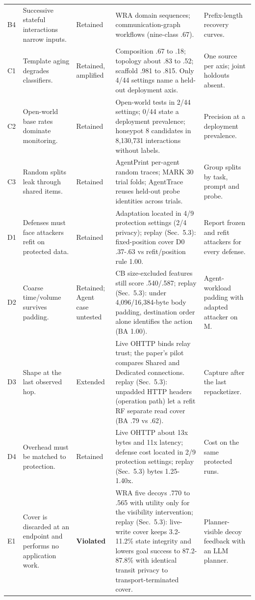 \begin{table}[t]
\begin{tabularx}{\textwidth}{@{}l>{\raggedright\arraybackslash}X>{\raggedright\arraybackslash}p{2.1cm}>{\raggedright\arraybackslash}X>{\raggedright\arraybackslash}X@{}}
B4 & Successive stateful interactions narrow inputs. & Retained & WRA domain sequences; communication-graph workflows (nine-class .67). & Prefix-length recovery curves.\\
C1 & Template aging degrades classifiers. & Retained, amplified & Composition .67 to .18; topology about .83 to .52; scaffold .981 to .815. Only 4/44 settings name a held-out deployment axis. & One source per axis; joint holdouts absent.\\
C2 & Open-world base rates dominate monitoring. & Retained & Open-world tests in 2/44 settings; 0/44 state a deployment prevalence; honeypot 8 candidates in 8,130,731 interactions without labels. & Precision at a deployment prevalence.\\
C3 & Random splits leak through shared items. & Retained & AgentPrint per-agent random traces; MARK 30 trial folds; AgentTrace reuses held-out probe identities across trials. & Group splits by task, prompt and probe.\\
D1 & Defenses must face attackers refit on protected data. & Retained & Adaptation located in 4/9 protection settings (2/4 privacy); replay (Sec.~5.3): fixed-position cover D0 .37-.63 vs refit/position rule 1.00. & Report frozen and refit attackers for every defense.\\
D2 & Coarse time/volume survives padding. & Retained; Agent case untested & CB size-excluded features still score .540/.587; replay (Sec.~5.3): under 4,096/16,384-byte body padding, destination order alone identifies the action (BA 1.00). & Agent-workload padding with adapted attacker on M.\\
D3 & Shape at the last observed hop. & Extended & Live OHTTP binds relay trust; the paper's pilot compares Shared and Dedicated connections. replay (Sec.~5.3): unpadded HTTP headers (operation path) let a refit RF separate read cover (BA .79 vs .62). & Capture after the last repacketizer.\\
D4 & Overhead must be matched to protection. & Retained & Live OHTTP about 13x bytes and 11x latency; defense cost located in 2/9 protection settings; replay (Sec.~5.3) bytes 1.25-1.40x. & Cost on the same protected runs.\\
E1 & Cover is discarded at an endpoint and performs no application work. & \textbf{Violated} & WRA five decoys .770 to .565 with utility only for the visibility intervention; replay (Sec.~5.3): live-write cover keeps 3.2-11.2\% state integrity and lowers goal success to 87.2-87.8\% with identical transit privacy to transport-terminated cover. & Planner-visible decoy feedback with an LLM planner.\\

\end{tabularx}
\end{table}
